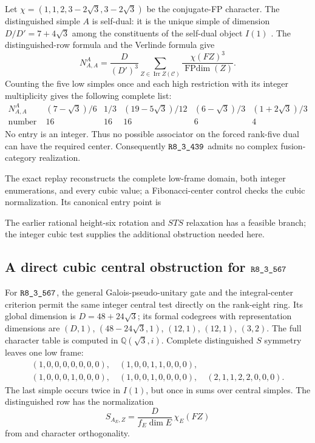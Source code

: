 Let $\chi=(1,1,2,3-2\sqrt3,3-2\sqrt3)$ be the conjugate-FP character.
The distinguished simple $A$ is self-dual: it is the unique simple
of dimension $D/D'=7+4\sqrt3$ among the constituents of the
self-dual object $I(1)$ \cite[Theorem~2.13]{OstrikPiv3}.
The distinguished-row formula \cite[equation~(39)]{DeshpandeCenter}
and the Verlinde formula give
\[
 N_{A,A}^{A}=\frac{D}{(D')^3}
       \sum_{Z\in\operatorname{Irr} Z(\mathcal C)}
       \frac{\chi(FZ)^3}{\operatorname{FPdim}(Z)}.
\]
Counting the five low simples once and each high restriction with its
integer multiplicity gives the following complete list:
\[
\begin{array}{c|ccccc}
N_{A,A}^{A}&(7-\sqrt3)/6&1/3&(19-5\sqrt3)/12&(6-\sqrt3)/3&(1+2\sqrt3)/3\\
\text{number of patterns}&16&16&16&6&4
\end{array}
\]
No entry is an integer.  Thus no possible associator on the forced
rank-five dual can have the required center.  Consequently
$\sha{R8_3_439}$ admits no complex fusion-category realization.

The exact replay reconstructs the complete low-frame domain, both
integer enumerations, and every cubic value; a Fibonacci-center
control checks the cubic normalization.  Its canonical entry point is
\begin{quote}\small{}\end{quote}
The earlier rational height-six rotation and $STS$ relaxation has a
feasible branch; the integer cubic test supplies the additional
obstruction needed here.

\subsection{A direct cubic central obstruction for \texorpdfstring{$\sha{R8_3_567}$}{R8,3,567}}
\label{subsec:r567-centerless-verlinde}

For $\sha{R8_3_567}$, the general Galois-pseudo-unitary gate and the
integral-center criterion permit the same integer central test directly
on the rank-eight ring.  Its global dimension is $D=48+24\sqrt3$;
its formal codegrees with representation dimensions are
$(D,1)$, $(48-24\sqrt3,1)$, $(12,1)$, $(12,1)$, $(3,2)$.
The full character table is computed in $\mathbb Q(\sqrt3,i)$.
Complete distinguished $S$ symmetry leaves one low frame:
\[
\begin{gathered}
(1,0,0,0,0,0,0,0),\quad(1,0,0,1,1,0,0,0),\\
(1,0,0,0,1,0,0,0),\quad(1,0,0,1,0,0,0,0),\quad
(2,1,1,2,2,0,0,0).
\end{gathered}
\]
The last simple occurs twice in $I(1)$, but once in sums over central
simples. The distinguished row has the normalization
\[
 S_{A_E,Z}=\frac{D}{f_E\dim E}\,\chi_E(FZ)
\]
from \cite[equation~(39)]{DeshpandeCenter} and character orthogonality.

